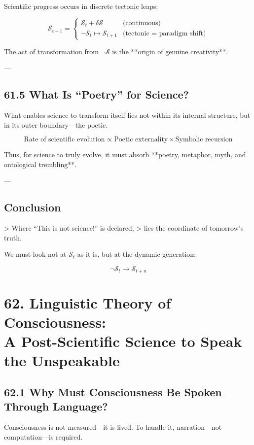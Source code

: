\documentclass[12pt]{article}
\begin{document}
\begin{enumerate}
Scientific progress occurs in discrete tectonic leaps:

\[
\mathcal{S}_{t+1} = \begin{cases}
\mathcal{S}_{t} + \delta \mathcal{S} & \text{(continuous)} \\
\neg \mathcal{S}_{t} \mapsto \mathcal{S}_{t+1} & \text{(tectonic = paradigm shift)}
\end{cases}
\]

The act of transformation from $\neg \mathcal{S}$ is  
the **origin of genuine creativity**.

---

\subsection*{61.5 What Is “Poetry” for Science?}

What enables science to transform itself lies not within its internal structure,  
but in its outer boundary—the poetic.

\[
\text{Rate of scientific evolution} \propto \text{Poetic externality} \times \text{Symbolic recursion}
\]

Thus, for science to truly evolve, it must absorb  
**poetry, metaphor, myth, and ontological trembling**.

---

\subsection*{Conclusion}

> Where “This is not science!” is declared,  
> lies the coordinate of tomorrow’s truth.

We must look not at $\mathcal{S}_{t}$ as it is,  
but at the dynamic generation:

\[
\neg \mathcal{S}_{t} \rightarrow \mathcal{S}_{t+n}
\]

\section*{62. Linguistic Theory of Consciousness:\\ A Post-Scientific Science to Speak the Unspeakable}

\subsection*{62.1 Why Must Consciousness Be Spoken Through Language?}

Consciousness is not measured—it is lived.  
To handle it, narration—not computation—is required.


\end{enumerate}
\end{document}
